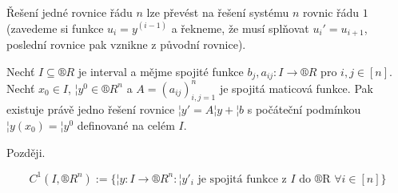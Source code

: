 \documentclass[12pt]{article}                   %
\begin{document}
        \begin{poznamka}
            Řešení jedné rovnice řádu $n$ lze převést na řešení systému $n$ rovnic řádu $1$ (zavedeme si funkce $u_i = y^{(i-1)}$ a řekneme, že musí splňovat $u_i' = u_{i+1}$, poslední rovnice pak vznikne z původní rovnice).
        \end{poznamka}


        \begin{veta}
                Nechť $I \subseteq ®R$ je interval a mějme spojité funkce $b_j, a_{ij}: I \rightarrow ®R$ pro $i, j \in [n]$. Nechť $x_0 \in I$, $¦y^0 \in ®R^n$ a $A = (a_{ij})_{i, j = 1}^n$ je spojitá maticová funkce. Pak existuje právě jedno řešení rovnice $¦y' = A¦y + ¦b$ s počáteční podmínkou $¦y(x_0) = ¦y^0$ definované na celém $I$.

            \begin{dukazin}
                Později.
            \end{dukazin}
        \end{veta}

        \begin{definice}
            $$ C^1(I, ®R^n) := \{¦y: I \rightarrow ®R^n: ¦y'_i \text{ je spojitá funkce z $I$ do ®R } \forall i \in [n]\} $$
        \end{definice}
\end{document}
